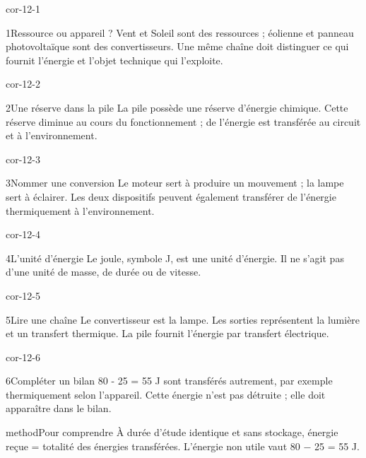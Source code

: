 \documentclass[12pt,twoside,openany]{book}
\begin{document}
\clearpage{}
\begin{blocLivre}{cor-12-1}
\begin{corrige}{1}{Ressource ou appareil ?}
Vent et Soleil sont des ressources ; éolienne et panneau photovoltaïque sont des convertisseurs. Une même chaîne doit distinguer ce qui fournit l’énergie et l’objet technique qui l’exploite.\par
\end{corrige}\end{blocLivre}
\begin{blocLivre}{cor-12-2}
\begin{corrige}{2}{Une réserve dans la pile}
La pile possède une réserve d’énergie chimique. Cette réserve diminue au cours du fonctionnement ; de l’énergie est transférée au circuit et à l’environnement.\par
\end{corrige}\end{blocLivre}
\begin{blocLivre}{cor-12-3}
\begin{corrige}{3}{Nommer une conversion}
Le moteur sert à produire un mouvement ; la lampe sert à éclairer. Les deux dispositifs peuvent également transférer de l’énergie thermiquement à l’environnement.\par
\end{corrige}\end{blocLivre}
\begin{blocLivre}{cor-12-4}
\begin{corrige}{4}{L’unité d’énergie}
Le joule, symbole J, est une unité d’énergie. Il ne s’agit pas d’une unité de masse, de durée ou de vitesse.\par
\end{corrige}\end{blocLivre}
\begin{blocLivre}{cor-12-5}
\begin{corrige}{5}{Lire une chaîne}
Le convertisseur est la lampe. Les sorties représentent la lumière et un transfert thermique. La pile fournit l’énergie par transfert électrique.\par
{}
\end{corrige}\end{blocLivre}
\begin{blocLivre}{cor-12-6}
\begin{corrige}{6}{Compléter un bilan}
80 - 25 = 55 J sont transférés autrement, par exemple thermiquement selon l’appareil. Cette énergie n’est pas détruite ; elle doit apparaître dans le bilan.\par
\begin{pcEncadre}{method}{Pour comprendre}
À durée d’étude identique et sans stockage, énergie reçue = totalité des énergies transférées. L’énergie non utile vaut 80 − 25 = 55 J.\par
\end{pcEncadre}
\end{corrige}\end{blocLivre}
\end{document}
